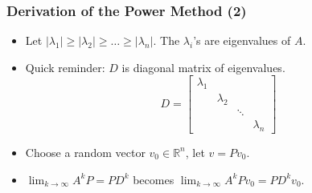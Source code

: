 \documentclass{beamer}
\begin{document}
\begin{frame}
	\frametitle{Derivation of the Power Method (2)}
	\begin{itemize}
		\item<1-> Let $\left|\lambda_1\right|\geq \left|\lambda_2\right|\geq\ldots\geq \left|\lambda_n\right|$. The $\lambda_i$'s are eigenvalues of $A$.
		\item<2-> Quick reminder: $D$ is diagonal matrix of eigenvalues.
			\begin{equation*}
				D=\begin{bmatrix}
					\lambda_1 &&& \\
					& \lambda_2 && \\
					&& \ddots & \\
					&&& \lambda_n
				\end{bmatrix}
			\end{equation*}
		\item<3-> Choose a random vector $v_0\in\mathbb R^n$, let $v=Pv_0$.
		\item<4-> $\displaystyle \lim_{k\to\infty}A^kP=PD^k$ becomes $\displaystyle \lim_{k\to\infty}A^kPv_0=PD^kv_0$.
	\end{itemize}
\end{frame}
\end{document}
